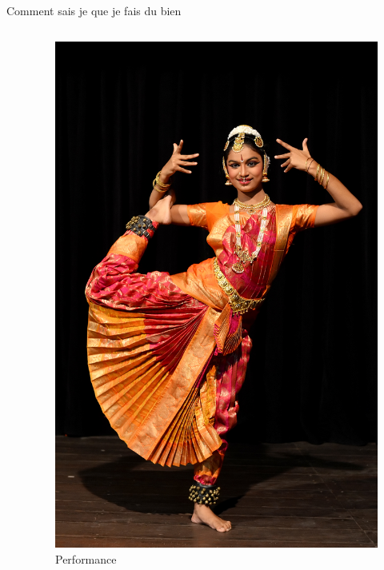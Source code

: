 \documentclass{beamer}
\begin{document}
\begin{frame}{Comment sais je que je fais du bien}
\begin{columns}
\begin{column}{0.6\textwidth}
\begin{block}{}
\end{block}
\end{column}
\begin{column}{0.4\textwidth}
\begin{block}{}
\begin{figure}
    \centering
    \includegraphics[width=\textwidth]{Bharata_Natyam_Performance_DS.jpg}
    \caption{Performance}
    \label{fig:synapto}
\end{figure}
\end{block}
\end{column}
\end{columns}
\end{frame}
\end{document}
